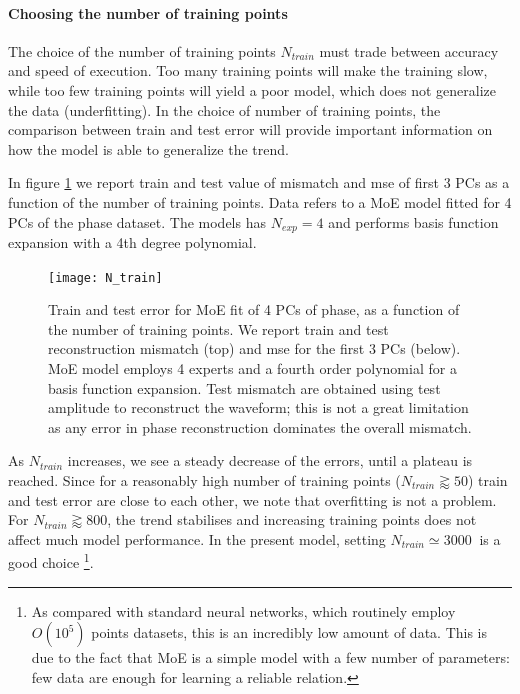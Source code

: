 \paragraph{Choosing the number of training points}
The choice of the number of training points $N_{train}$ must trade between accuracy and speed of execution. Too many training points will make the training slow, while too few training points will yield a poor model, which does not generalize the data (underfitting).
In the choice of number of training points, the comparison between train and test error will provide important information on how the model is able to generalize the trend.
\par
In figure \ref{fig:N_train} we report train and test value of mismatch and mse of first 3 PCs as a function of the number of training points. Data refers to a MoE model fitted for 4 PCs of the phase dataset. The models has ${N_{exp} = 4}$ and performs basis function expansion with a 4th degree polynomial.
\begin{figure}
	\centering
    \texttt{[image: N\_train]}
	\caption{Train and test error for MoE fit of 4 PCs of phase, as a function of the number of training points. We report train and test reconstruction mismatch (top) and mse for the first 3 PCs (below).
    MoE model employs 4 experts and a fourth order polynomial for a basis function expansion.
	Test mismatch are obtained using test amplitude to reconstruct the waveform; this is not a great limitation as any error in phase reconstruction dominates the overall mismatch.
    }
	\label{fig:N_train}
\end{figure}
\par
As $N_{train}$ increases, we see a steady decrease of the errors, until a plateau is reached.
Since for a reasonably high number of training points ($N_{train} \gtrapprox 50$) train and test error are close to each other, we note that overfitting is not a problem.
For $N_{train} \gtrapprox 800$, the trend stabilises and increasing training points does not affect much model performance.
In the present model, setting $N_{train} \simeq \SI{3000}{}$ is a good choice
\footnote{As compared with standard neural networks, which routinely employ $O(10^5)$ points datasets, this is an incredibly low amount of data. This is due to the fact that MoE is a simple model with a few number of parameters: few data are enough for learning a reliable relation.}.
